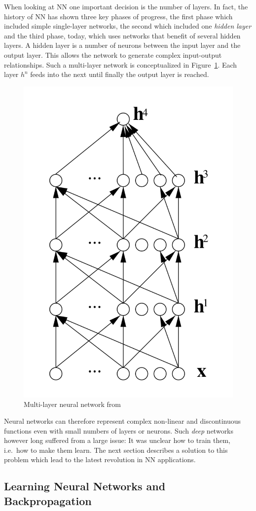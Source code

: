 When looking at \ac{NN} one important decision is the number of layers. In fact, the history of \acl{NN} has shown
three key phases of progress, the first phase which included simple single-layer networks, the second which included one
\emph{hidden layer} and the third phase, today, which uses networks that benefit of several hidden layers. A hidden
layer is a number of neurons between the input layer and the output layer. This allows the network to generate complex
input-output relationships. Such a multi-layer network is conceptualized in Figure~\ref{fig:multilayernn}. Each layer
$h^n$ feeds into the next until finally the output layer is reached.

\begin{figure}[]
    \centering
    \includegraphics[width=0.3\linewidth]{img/multilayer_nn.png}
    \caption{Multi-layer neural network from \cite[]{bengio2009learning} }
    \label{fig:multilayernn}
\end{figure}

Neural networks can therefore represent complex non-linear and discontinuous functions
\cite[p.732]{russell2016artificial} even with small numbers of layers or neurons. Such \emph{deep} networks however long
suffered from a large issue: It was unclear how to train them, i.e.\ how to make them learn. The next section describes a
solution to this problem which lead to the latest revolution in \ac{NN} applications.

\subsection{Learning Neural Networks and Backpropagation}
\label{sec:Backpropagation}





